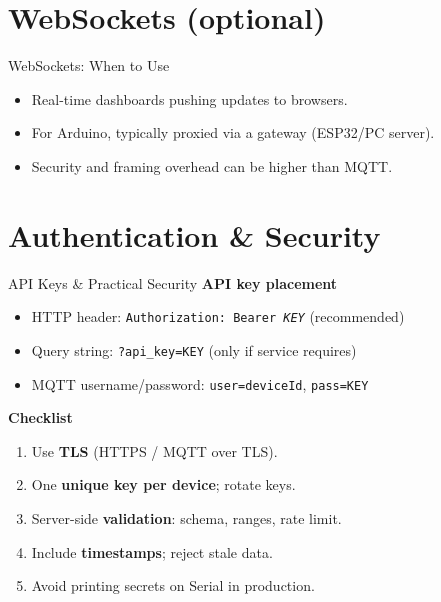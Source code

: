 \documentclass[aspectratio=169]{beamer}
\begin{document}
\section{WebSockets (optional)}
\begin{frame}{WebSockets: When to Use}
\begin{itemize}
  \item Real-time dashboards pushing updates to browsers.
  \item For Arduino, typically proxied via a gateway (ESP32/PC server).
  \item Security and framing overhead can be higher than MQTT.
\end{itemize}
\end{frame}

\section{Authentication \& Security}
\begin{frame}{API Keys \& Practical Security}
\textbf{API key placement}
\begin{itemize}
  \item HTTP header: \texttt{Authorization: Bearer \textit{KEY}} (recommended)
  \item Query string: \texttt{?api\_key=KEY} (only if service requires)
  \item MQTT username/password: \texttt{user=deviceId}, \texttt{pass=KEY}
\end{itemize}
\medskip
\textbf{Checklist}
\begin{enumerate}
  \item Use \textbf{TLS} (HTTPS / MQTT over TLS).
  \item One \textbf{unique key per device}; rotate keys.
  \item Server-side \textbf{validation}: schema, ranges, rate limit.
  \item Include \textbf{timestamps}; reject stale data.
  \item Avoid printing secrets on Serial in production.
\end{enumerate}
\end{frame}

\end{document}
